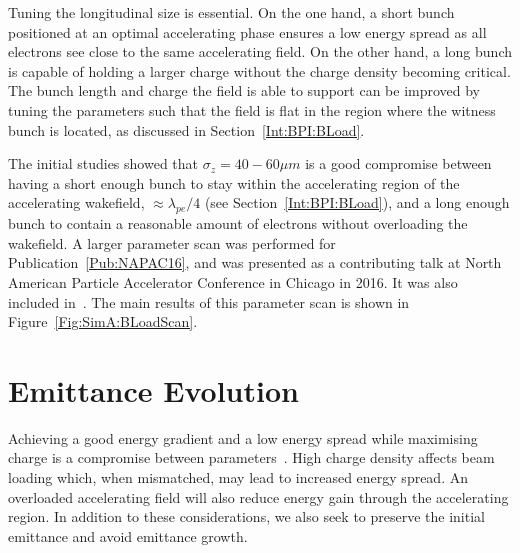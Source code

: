 Tuning the longitudinal size is essential.
On the one hand, a short bunch positioned at an optimal accelerating phase ensures a low energy spread as all electrons see close to the same accelerating field.
On the other hand, a long bunch is capable of holding a larger charge without the charge density becoming critical.
The bunch length and charge the field is able to support can be improved by tuning the parameters such that the field is flat in the region where the witness bunch is located, as discussed in Section~\ref{Int:BPI:BLoad}.

The initial studies showed that $\sigma_{z} = 40-60\unit{\mu m}$ is a good compromise between having a short enough bunch to stay within the accelerating region of the accelerating wakefield, $\approx \lambda_{pe}/4$ (see Section~\ref{Int:BPI:BLoad}), and a long enough bunch to contain a reasonable amount of electrons without overloading the wakefield.
A larger parameter scan was performed for Publication~\ref{Pub:NAPAC16}, and was presented as a contributing talk at North American Particle Accelerator Conference in Chicago in 2016.
It was also included in~\cite{adli:2016a}.
The main results of this parameter scan is shown in Figure~\ref{Fig:SimA:BLoadScan}.

\section{Emittance Evolution}
\label{SimA:Emitt}

Achieving a good energy gradient and a low energy spread while maximising charge is a compromise between parameters~\cite{berglyd_olsen:2018}.
High charge density affects beam loading which, when mismatched, may lead to increased energy spread.
An overloaded accelerating field will also reduce energy gain through the accelerating region.
In addition to these considerations, we also seek to preserve the initial emittance and avoid emittance growth.

